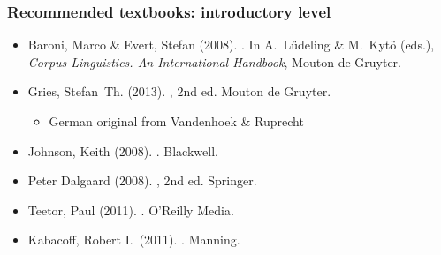 \documentclass[t]{beamer} %
\begin{document}
\begin{frame}
  \frametitle{Recommended textbooks: introductory level}

  \small
  \begin{itemize}
  \item Baroni, Marco \& Evert, Stefan (2008).  .  In A.~L{\"u}deling \& M.~Kyt{\"o}
    (eds.), {\em Corpus Linguistics. An International Handbook}, Mouton de Gruyter.
    \\[1ex]
  \item Gries, Stefan~Th. (2013). , 2nd ed. Mouton de Gruyter. %
    \secondary{[\texteuro 29]}
    \begin{itemize}
    \item German original from Vandenhoek \& Ruprecht \secondary{[\texteuro 25]}
    \\[1ex]
    \end{itemize}
  \item Johnson, Keith (2008). .
    Blackwell. \secondary{[\texteuro 38]}
    \\[1ex]
  \item Peter Dalgaard (2008). ,
     2nd ed. Springer. \secondary{[\texteuro 52]}
    \\[1ex]
  \item Teetor, Paul (2011). . O'Reilly Media. \secondary{[\texteuro 25]}
    \\[1ex]
  \item Kabacoff, Robert I.\ (2011). . Manning. \secondary{[\texteuro 40]}
  \end{itemize}
\end{frame}
\end{document}
